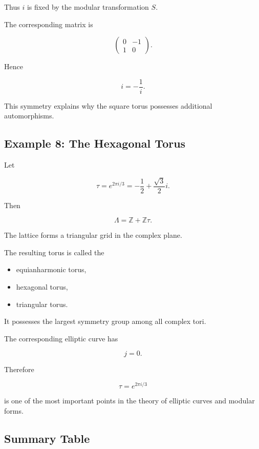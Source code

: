 \documentclass[12pt,a4paper]{article}
\theoremstyle{notespace}
\begin{document}
Thus \(i\) is fixed by the modular transformation \(S\).

The corresponding matrix is

\[
\begin{pmatrix}
	0&-1\\
	1&0
\end{pmatrix}.
\]

Hence

\[
\boxed{
	i
	=
	-\frac1i.
}
\]

This symmetry explains why the square torus possesses additional
automorphisms.

\subsection{Example 8: The Hexagonal Torus}

Let

\[
\tau
=
e^{2\pi i/3}
=
-\frac12+\frac{\sqrt3}{2}i.
\]

Then

\[
\Lambda
=
\mathbb Z+\mathbb Z\tau.
\]

The lattice forms a triangular grid in the complex plane.

The resulting torus is called the

\begin{itemize}
	\item equianharmonic torus,
	\item hexagonal torus,
	\item triangular torus.
\end{itemize}

It possesses the largest symmetry group among all complex tori.

The corresponding elliptic curve has

\[
j=0.
\]

Therefore

\[
\boxed{
	\tau=e^{2\pi i/3}
}
\]

is one of the most important points in the theory of elliptic curves and
modular forms.

\subsection{Summary Table}
\end{document}
